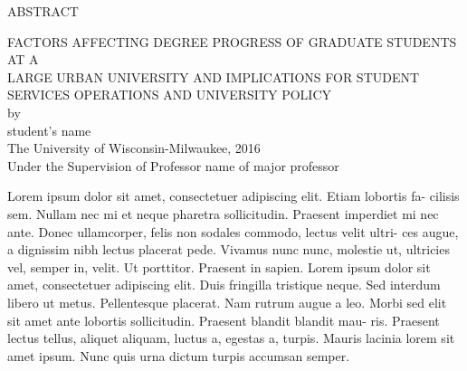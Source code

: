\newpage
{}
\centerline{ABSTRACT}
\begin{center}
FACTORS AFFECTING DEGREE PROGRESS OF GRADUATE STUDENTS AT A \\LARGE URBAN UNIVERSITY AND IMPLICATIONS FOR STUDENT \\SERVICES OPERATIONS AND UNIVERSITY POLICY \\[1cm]
by\\[1cm]
student's name \\[2cm]
The University of Wisconsin-Milwaukee, 2016\\
Under the Supervision of Professor name of major professor\\[2.5cm]
\end{center}
Lorem ipsum dolor sit amet, consectetuer adipiscing elit. Etiam lobortis fa- cilisis sem. Nullam nec mi et neque pharetra sollicitudin. Praesent imperdiet mi nec ante. Donec ullamcorper, felis non sodales commodo, lectus velit ultri- ces augue, a dignissim nibh lectus placerat pede. Vivamus nunc nunc, molestie ut, ultricies vel, semper in, velit. Ut porttitor. Praesent in sapien. Lorem ipsum dolor sit amet, consectetuer adipiscing elit. Duis fringilla tristique neque. Sed interdum libero ut metus. Pellentesque placerat. Nam rutrum augue a leo. Morbi sed elit sit amet ante lobortis sollicitudin. Praesent blandit blandit mau- ris. Praesent lectus tellus, aliquet aliquam, luctus a, egestas a, turpis. Mauris lacinia lorem sit amet ipsum. Nunc quis urna dictum turpis accumsan semper.
